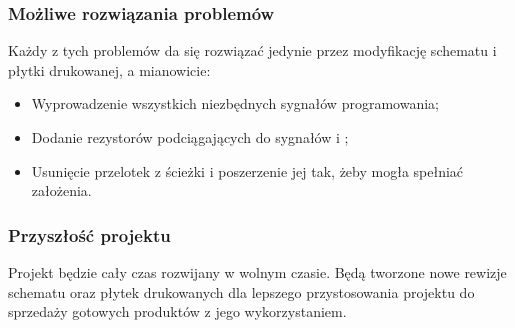 \documentclass{beamer}
\begin{document}
\begin{frame}
\frametitle{Możliwe rozwiązania problemów}
	Każdy z tych problemów da się rozwiązać jedynie przez modyfikację schematu i płytki drukowanej, a mianowicie:
	\begin{itemize}
		\item Wyprowadzenie wszystkich niezbędnych sygnałów programowania;
		\item Dodanie rezystorów podciągających do sygnałów  i ;
		\item Usunięcie przelotek z ścieżki i poszerzenie jej tak, żeby mogła spełniać założenia.
	\end{itemize}
\end{frame}
\begin{frame}
\frametitle{Przyszłość projektu}
	Projekt będzie cały czas rozwijany w wolnym czasie. Będą tworzone nowe rewizje schematu oraz płytek drukowanych dla lepszego przystosowania projektu do sprzedaży gotowych produktów z jego wykorzystaniem.
\end{frame}
\end{document}
